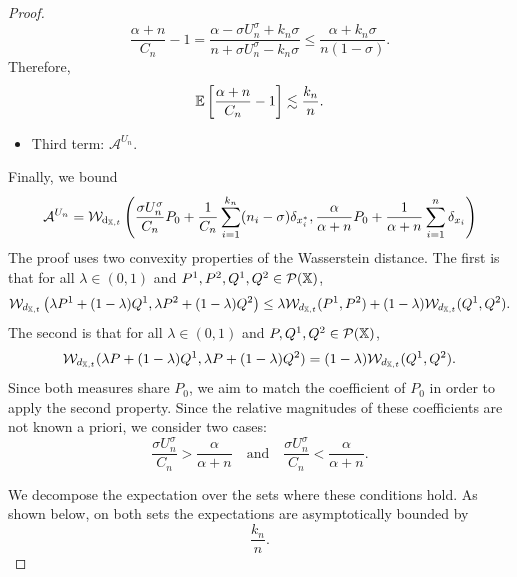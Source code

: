 \begin{proof}
    
    \[
    \frac{\alpha + n}{C_n} - 1 = \frac{\alpha -  \sigma U_n^\sigma + k_n \sigma}{n +  \sigma U_n^\sigma - k_n \sigma}\leq
    \frac{\alpha + k_n \sigma}{n(1- \sigma)}.
    \]
    Therefore,
    \[
    \mathbb{E} \left[\frac{\alpha + n}{C_n} - 1\right] \lesssim \frac{k_n}{n}.
    \]
    \begin{itemize}
        \item Third term: $\mathcal{A}^{U_n}$.
    \end{itemize}
    Finally, we bound
    \[
    \mathcal{A}^{U_n} = \mathcal{W}_{\mathrm{d}_{\mathbb{X},t}} \left( \frac{ \sigma U_n^\sigma}{C_n}P_0 + \frac{1}{C_n}\sum_{i = 1}^{k_n}(n_i - \sigma)\delta_{x_i^*}, \frac{\alpha}{\alpha + n}P_0 + \frac{1}{\alpha + n}\sum_{i = 1}^n \delta_{x_i}\right)
    \]
    The proof uses two convexity properties of the Wasserstein distance. The first is that for all $\lambda \in (0,1)$ and $P^1,P^2,Q^1,Q^2 \in \mathcal{P}(\mathbb{X})$,
    \[
    \mathcal{W}_{d_{\mathbb{X},t}}\left( \lambda P^1 + (1-\lambda)Q^1, \lambda P^2 + (1-\lambda)Q^2 \right) \leq \lambda \mathcal{W}_{d_{\mathbb{X},t}}(P^1,P^2) + (1-\lambda)\mathcal{W}_{d_{\mathbb{X},t}}(Q^1,Q^2).
    \]
    The second is that for all $\lambda \in (0,1)$ and $P,Q^1,Q^2 \in \mathcal{P}(\mathbb{X})$,
    \[
    \mathcal{W}_{d_{\mathbb{X},t}} (\lambda  P + (1-\lambda)Q^1, \lambda P + (1-\lambda)Q^2) = (1-\lambda)\mathcal{W}_{d_{\mathbb{X},t}}(Q^1,Q^2).
    \]
    Since both measures share $P_0$, we aim to match the coefficient of $P_0$ in order to apply the second property. Since the relative magnitudes of these coefficients are not known a priori, we consider two cases:
    \[
    \frac{ \sigma U_n^\sigma}{C_n} > \frac{\alpha}{\alpha + n} \quad \text{and} \quad 
    \frac{ \sigma U_n^\sigma}{C_n} < \frac{\alpha}{\alpha + n}.
    \]
 
    We decompose the expectation over the sets where these conditions hold. As shown below, on both sets the expectations are asymptotically bounded by
    \[
    \frac{k_n}{n}.
    \]


\end{proof}

